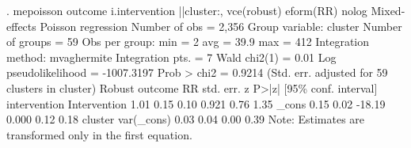 . mepoisson outcome i.intervention ||cluster:, vce(robust) eform(RR) nolog
{\smallskip}
Mixed-effects Poisson regression                Number of obs     =      2,356
Group variable: cluster                         Number of groups  =         59
{\smallskip}
                                                Obs per group:
                                                              min =          2
                                                              avg =       39.9
                                                              max =        412
{\smallskip}
Integration method: mvaghermite                 Integration pts.  =          7
{\smallskip}
                                                Wald chi2(1)      =       0.01
Log pseudolikelihood = -1007.3197               Prob > chi2       =     0.9214
                                (Std. err. adjusted for 59 clusters in cluster)
              {\VBAR}               Robust
      outcome {\VBAR}         RR   std. err.      z    P>|z|     [95\% conf. interval]
 intervention {\VBAR}
Intervention  {\VBAR}       1.01       0.15     0.10   0.921         0.76        1.35
        _cons {\VBAR}       0.15       0.02   -18.19   0.000         0.12        0.18
cluster       {\VBAR}
    var(_cons){\VBAR}       0.03       0.04                          0.00        0.39
Note: Estimates are transformed only in the first equation.
